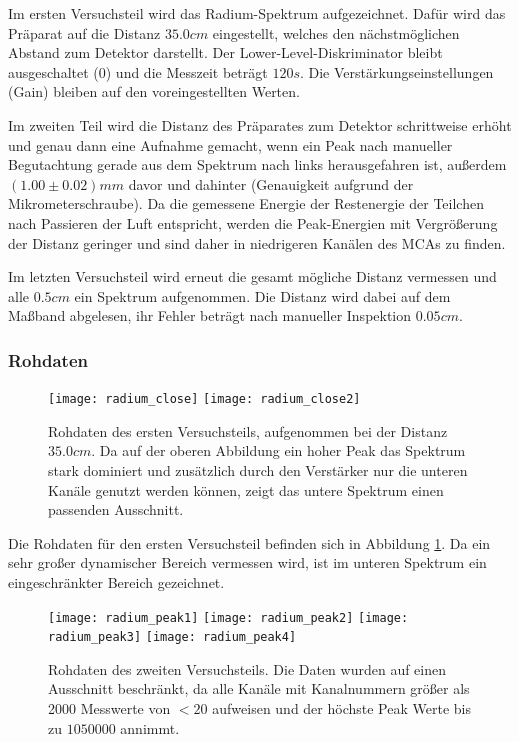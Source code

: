 \documentclass{../Misc/MontavonLaTeX/Montavon}
\newcommand{\halfwidth}{0.48\textwidth}
\newcommand{\fullwidth}{1.0\textwidth}
\begin{document}
Im ersten Versuchsteil wird das Radium-Spektrum aufgezeichnet. Dafür wird das Präparat auf die Distanz $35.0 \unit{cm}$ eingestellt, welches den nächstmöglichen Abstand zum Detektor darstellt. 
Der Lower-Level-Diskriminator bleibt ausgeschaltet ($0$) und die Messzeit beträgt $120 \unit{s}$. Die Verstärkungseinstellungen (Gain) bleiben auf den voreingestellten Werten.

Im zweiten Teil wird die Distanz des Präparates zum Detektor schrittweise erhöht und genau dann eine Aufnahme gemacht, wenn ein Peak nach manueller Begutachtung gerade aus dem Spektrum nach links herausgefahren ist, außerdem $(1.00 \pm 0.02) \unit{mm}$ davor und dahinter (Genauigkeit aufgrund der Mikrometerschraube). Da die gemessene Energie der Restenergie der Teilchen nach Passieren der Luft entspricht, werden die Peak-Energien mit Vergrößerung der Distanz geringer und sind daher in niedrigeren Kanälen des MCAs zu finden.

Im letzten Versuchsteil wird erneut die gesamt mögliche Distanz vermessen und alle $0.5 \unit{cm}$ ein Spektrum aufgenommen. Die Distanz wird dabei auf dem Maßband abgelesen, ihr Fehler beträgt nach manueller Inspektion $0.05 \unit{cm}$.

\subsubsection{Rohdaten}

\begin{figure}[htbp]
\centering
\texttt{[image: radium\_close]}
\texttt{[image: radium\_close2]}
\caption{Rohdaten des ersten Versuchsteils, aufgenommen bei der Distanz $35.0 \unit{cm}$. Da auf der oberen Abbildung ein hoher Peak das Spektrum stark dominiert und zusätzlich durch den Verstärker nur die unteren Kanäle genutzt werden können, zeigt das untere Spektrum einen passenden Ausschnitt.}
\label{fig:radium_close}
\end{figure}

Die Rohdaten für den ersten Versuchsteil befinden sich in Abbildung \ref{fig:radium_close}. Da ein sehr großer dynamischer Bereich vermessen wird, ist im unteren Spektrum ein eingeschränkter Bereich gezeichnet.

\begin{figure}[htbp]
\centering
\texttt{[image: radium\_peak1]}
\texttt{[image: radium\_peak2]}
\texttt{[image: radium\_peak3]}
\texttt{[image: radium\_peak4]}
\caption{Rohdaten des zweiten Versuchsteils. Die Daten wurden auf einen Ausschnitt beschränkt, da alle Kanäle mit Kanalnummern größer als 2000 Messwerte von $< 20$ aufweisen und der höchste Peak Werte bis zu $1050000$ annimmt.}
\label{fig:radium_peaks}
\end{figure}
\end{document}
